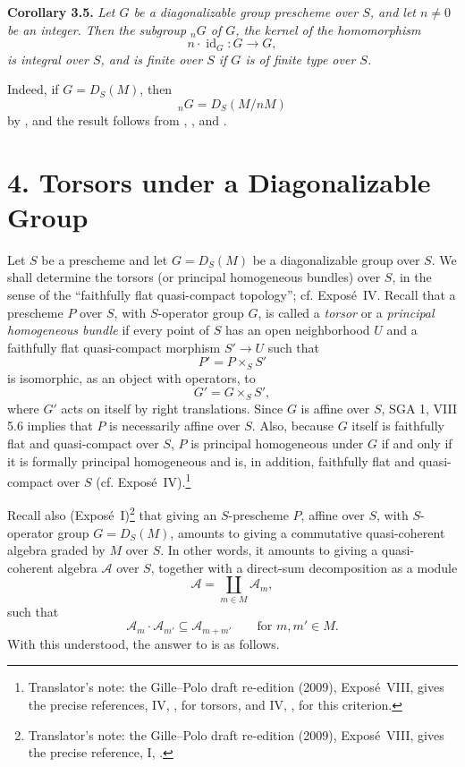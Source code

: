 \medskip
\noindent{}\textbf{Corollary 3.5.}
\textit{Let \(G\) be a diagonalizable group prescheme over \(S\), and let
\(n\ne0\) be an integer. Then the subgroup \({}_nG\) of \(G\), the
kernel of the homomorphism}
\[
  n\mathbin{\cdot}\operatorname{id}_G:G\longrightarrow G,
\]
\textit{is integral over \(S\), and is finite over \(S\) if \(G\) is of
finite type over \(S\).}

Indeed, if \(G=D_S(M)\), then
\[
  {}_nG=D_S(M/nM)
\]
by , and the result follows from
,
, and
.

\section*{4. Torsors under a Diagonalizable Group}

Let \(S\) be a prescheme and let \(G=D_S(M)\) be a diagonalizable group
over \(S\). We shall determine the torsors (or principal homogeneous
bundles) over \(S\), in the sense of the ``faithfully flat quasi-compact
topology''; cf. Expos\'e~IV. Recall that a prescheme \(P\)
over \(S\), with \(S\)-operator group \(G\), is called a \emph{torsor} or
a \emph{principal homogeneous bundle} if every point of \(S\) has an
open neighborhood \(U\) and a faithfully flat quasi-compact morphism
\(S'\to U\) such that
\[
  P'=P\times_SS'
\]
is isomorphic, as an object with operators, to
\[
  G'=G\times_SS',
\]
where \(G'\) acts on itself by right translations. Since \(G\) is affine
over \(S\), SGA 1, VIII 5.6 implies that \(P\) is necessarily affine over
\(S\). Also, because \(G\) itself is faithfully flat and quasi-compact
over \(S\), \(P\) is principal homogeneous under \(G\) if and only if it
is formally principal homogeneous and is, in addition, faithfully flat
and quasi-compact over \(S\) (cf. Expos\'e~IV).\footnote{Translator's note: the Gille--Polo
draft re-edition (2009), Expos\'e~VIII, gives the precise references, IV,
, for torsors, and IV,
, for this criterion.}

Recall also (Expos\'e~I)\footnote{Translator's note: the Gille--Polo draft re-edition (2009),
Expos\'e~VIII, gives the precise reference, I, .} that giving an
\(S\)-prescheme \(P\), affine
over \(S\), with \(S\)-operator group \(G=D_S(M)\), amounts to giving a
commutative quasi-coherent algebra graded by \(M\) over \(S\). In other
words, it amounts to giving a quasi-coherent algebra \(\mathscr A\) over
\(S\), together with a direct-sum decomposition as a module
\[
  \mathscr A=\coprod_{m\in M}\mathscr A_m,
\]
such that
\[
  \mathscr A_m\mathbin{\cdot}\mathscr A_{m'}
  \subseteq\mathscr A_{m+m'}
  \qquad\text{for }m,m'\in M.
\]
With this understood, the answer to  is as follows.

